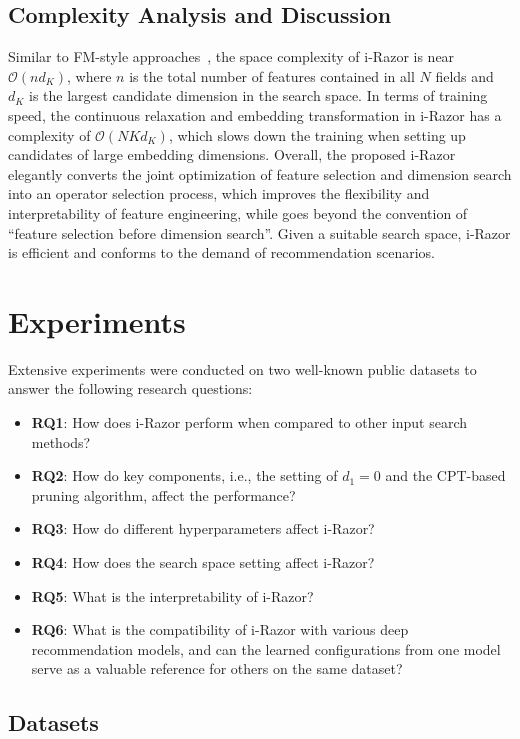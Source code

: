 \documentclass[10pt,journal,compsoc]{IEEEtran}
\begin{document}
\subsection{Complexity Analysis and Discussion}
\label{sec-com}
Similar to FM-style approaches~\cite{guo2017deepfm,rendle2010factorization, zhang2016deep}, the space complexity of i-Razor is near $\mathcal{O}(nd_K)$, where $n$ is the total number of features contained in all $N$ fields and $d_K$ is the largest candidate dimension in the search space. 
In terms of training speed, the continuous relaxation and embedding transformation in i-Razor has a complexity of $\mathcal{O}(NKd_K)$, which slows down the training when setting up candidates of large embedding dimensions. Overall, the proposed i-Razor elegantly converts the joint optimization of feature selection and dimension search into an operator selection process, which improves the flexibility 
and interpretability of feature engineering, while goes beyond the convention of ``feature selection before dimension search''. Given a suitable search space, i-Razor is efficient and conforms to the demand of recommendation scenarios.

\section{Experiments}\label{sec:offline-exp}
Extensive experiments were conducted on two well-known public datasets to answer the following research questions:
\begin{itemize}
    \item \textbf{RQ1}: How does i-Razor perform when compared to other input search methods?
    \item \textbf{RQ2}: How do key components, i.e., the setting of $d_1=0$ and the CPT-based pruning algorithm, affect the performance?
    \item \textbf{RQ3}: How do different hyperparameters affect i-Razor?
    \item \textbf{RQ4}: How does the search space setting  affect i-Razor?
    \item \textbf{RQ5}: What is the interpretability  of i-Razor?
    \item \textbf{RQ6}: What is the compatibility of i-Razor with various deep recommendation models, and can the learned configurations from one model serve as a valuable reference for others on the same dataset?
\end{itemize}

\subsection{Datasets}
\end{document}
